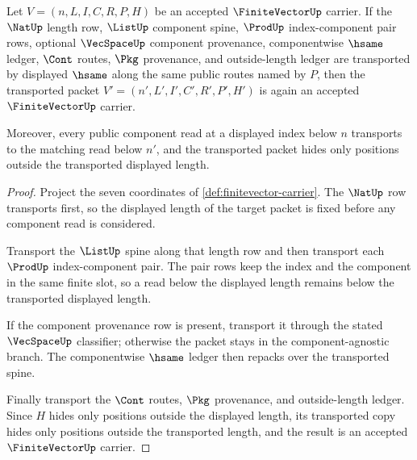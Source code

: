 \begin{theorem}
\label{thm:finitevector-length-index-stability}
Let $V=(n,L,I,C,R,P,H)$ be an accepted $\FiniteVectorUp$ carrier. If the $\NatUp$ length row, $\ListUp$ component spine, $\ProdUp$ index-component pair rows, optional $\VecSpaceUp$ component provenance, componentwise $\hsame$ ledger, $\Cont$ routes, $\Pkg$ provenance, and outside-length ledger are transported by displayed $\hsame$ along the same public routes named by $P$, then the transported packet $V'=(n',L',I',C',R',P',H')$ is again an accepted $\FiniteVectorUp$ carrier.

Moreover, every public component read at a displayed index below $n$ transports to the matching read below $n'$, and the transported packet hides only positions outside the transported displayed length.
\end{theorem}
\begin{proof}
Project the seven coordinates of \autoref{def:finitevector-carrier}. The $\NatUp$ row transports first, so the displayed length of the target packet is fixed before any component read is considered.

Transport the $\ListUp$ spine along that length row and then transport each $\ProdUp$ index-component pair. The pair rows keep the index and the component in the same finite slot, so a read below the displayed length remains below the transported displayed length.

If the component provenance row is present, transport it through the stated $\VecSpaceUp$ classifier; otherwise the packet stays in the component-agnostic branch. The componentwise $\hsame$ ledger then repacks over the transported spine.

Finally transport the $\Cont$ routes, $\Pkg$ provenance, and outside-length ledger. Since $H$ hides only positions outside the displayed length, its transported copy hides only positions outside the transported length, and the result is an accepted $\FiniteVectorUp$ carrier.
\end{proof}

